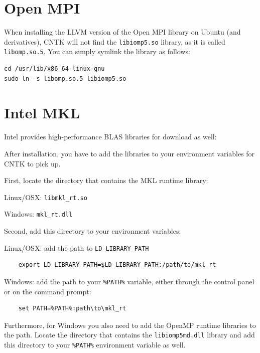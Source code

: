 \documentclass[a4paper]{book}
\begin{document}
\chapter{Open MPI}

When installing the LLVM version of the Open MPI library on Ubuntu (and
derivatives), CNTK will not find the \texttt{libiomp5.so} library, as it
is called \texttt{libomp.so.5}. You can simply symlink the library as
follows:
\begin{verbatim}
cd /usr/lib/x86_64-linux-gnu
sudo ln -s libomp.so.5 libiomp5.so
\end{verbatim}

\chapter{Intel MKL}
Intel provides high-performance BLAS libraries for download as well\cite{mkl}:

After installation, you have to add the libraries to your environment
variables for CNTK to pick up.

\noindent First, locate the directory that contains the MKL runtime library:
\begin{tight_itemize}
  \item Linux/OSX: \texttt{libmkl\_rt.so}
  \item Windows: \texttt{mkl\_rt.dll}
\end{tight_itemize}

\noindent Second, add this directory to your environment variables:
\begin{tight_itemize}
  \item Linux/OSX: add the path to \texttt{LD\_LIBRARY\_PATH}
    \begin{verbatim}
    export LD_LIBRARY_PATH=$LD_LIBRARY_PATH:/path/to/mkl_rt
    \end{verbatim}
  \item Windows: add the path to your \texttt{\%PATH\%} variable, either
  through the control panel or on the command prompt:
    \begin{verbatim}
    set PATH=%PATH%:path\to\mkl_rt
    \end{verbatim}
\end{tight_itemize}

\noindent Furthermore, for Windows you also need to add the OpenMP runtime
libraries to the path. Locate the directory that contains the
\texttt{libiomp5md.dll} library and add this directory to your \texttt{\%PATH\%}
environment variable as well.


\end{document}
